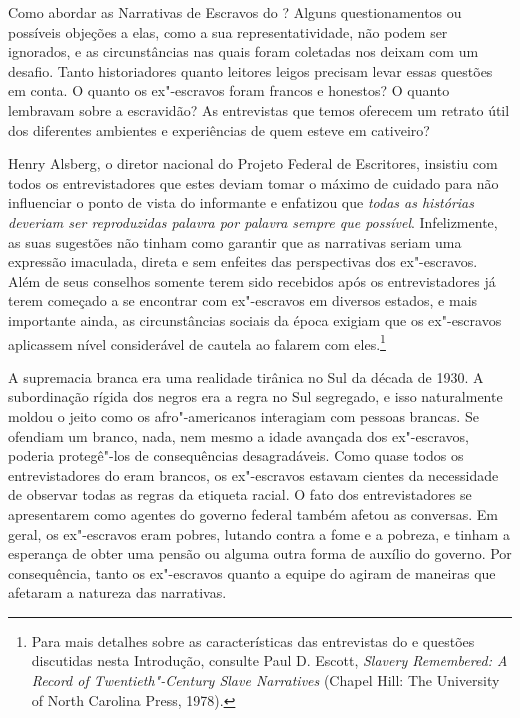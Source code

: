 Como abordar as Narrativas de Escravos do ? Alguns questionamentos ou
possíveis objeções a elas, como a sua representatividade, não podem ser
ignorados, e as circunstâncias nas quais foram coletadas nos deixam com
um desafio. Tanto historiadores quanto leitores leigos precisam levar
essas questões em conta. O quanto os ex"-escravos foram francos e
honestos? O quanto lembravam sobre a escravidão? As entrevistas que
temos oferecem um retrato útil dos diferentes ambientes e experiências
de quem esteve em cativeiro?

Henry Alsberg, o diretor nacional do Projeto Federal de Escritores,
insistiu com todos os entrevistadores que estes deviam tomar o máximo de
cuidado para não influenciar o ponto de vista do informante e enfatizou
que \emph{todas as histórias deveriam ser reproduzidas palavra por
palavra sempre que possível}. Infelizmente, as suas sugestões não tinham
como garantir que as narrativas seriam uma expressão imaculada, direta e
sem enfeites das perspectivas dos ex"-escravos. Além de seus conselhos
somente terem sido recebidos após os entrevistadores já terem começado a
se encontrar com ex"-escravos em diversos estados, e mais importante
ainda, as circunstâncias sociais da época exigiam que os ex"-escravos
aplicassem nível considerável de cautela ao falarem com eles.\footnote{Para
  mais detalhes sobre as características das entrevistas do  e
  questões discutidas nesta Introdução, consulte Paul D. Escott,
  \emph{Slavery Remembered: A Record of Twentieth"-Century Slave
  Narratives} (Chapel Hill: The University of North Carolina Press,
  1978).}

A supremacia branca era uma realidade tirânica no Sul da década de 1930.
A subordinação rígida dos negros era a regra no Sul segregado, e isso
naturalmente moldou o jeito como os afro"-americanos interagiam com
pessoas brancas. Se ofendiam um branco, nada, nem mesmo a idade avançada
dos ex"-escravos, poderia protegê"-los de consequências desagradáveis.
Como quase todos os entrevistadores do  eram brancos, os ex"-escravos
estavam cientes da necessidade de observar todas as regras da etiqueta
racial. O fato dos entrevistadores se apresentarem como agentes do
governo federal também afetou as conversas. Em geral, os ex"-escravos
eram pobres, lutando contra a fome e a pobreza, e tinham a esperança de
obter uma pensão ou alguma outra forma de auxílio do governo. Por
consequência, tanto os ex"-escravos quanto a equipe do  agiram de
maneiras que afetaram a natureza das narrativas.

